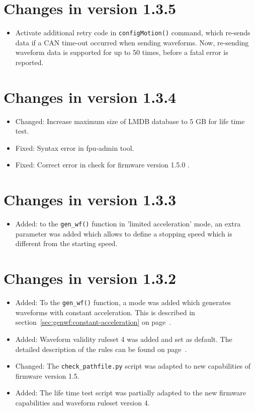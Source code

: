 \documentclass[fontsize=12,a4paper]{scrreprt}
\begin{document}
\section*{Changes in version 1.3.5}
\begin{itemize}
\item Activate additional retry code in \texttt{configMotion()}
  command, which re-sends data if a CAN time-out occurred when sending
  waveforms.  Now, re-sending waveform data is supported for up to 50
  times, before a fatal error is reported.
\end{itemize}

\section*{Changes in version 1.3.4}
\begin{itemize}
\item Changed: Increase maximum size of LMDB database to 5 GB for life time test.
\item Fixed: Syntax error in fpu-admin tool.
\item Fixed: Correct error in check for firmware version 1.5.0 .
\end{itemize}


\section*{Changes in version 1.3.3}
\begin{itemize}
\item Added: to the \texttt{gen\_wf()} function in 'limited
  acceleration' mode, an extra parameter was added which allows to
  define a stopping speed which is different from the starting speed.
\end{itemize}

\section*{Changes in version 1.3.2}
\begin{itemize}
\item Added: To the \texttt{gen\_wf()} function, a mode
  was added which generates waveforms with constant acceleration.
  This is described in section~\ref{sec:genwf:constant-acceleration}
  on page~\pageref{sec:genwf:constant-acceleration}.

\item Added: Waveform validity ruleset 4 was added and set as default.
  The detailed description of the rules can be found on
  page~\pageref{sec:wfrulesetv4}.

\item Changed: The \texttt{check\_pathfile.py} script was adapted to
  new capabilities of firmware version 1.5.

\item Added: The life time test script was partially adapted to the
  new firmware capabilities and waveform ruleset version 4.

\end{itemize}
\end{document}
